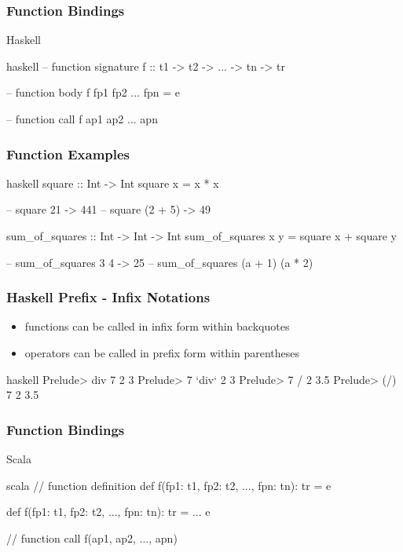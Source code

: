 \documentclass[dvipsnames]{beamer}
\theoremstyle{plain}
\begin{document}
\begin{frame}[fragile]
  \frametitle{Function Bindings}

  \begin{block}{Haskell}
    \begin{pygments}{haskell}
-- function signature
f :: t1 -> t2 -> ... -> tn -> tr

-- function body
f fp1 fp2 ... fpn = e

-- function call
f ap1 ap2 ... apn
    \end{pygments}
  \end{block}
\end{frame}

\begin{frame}[fragile]
  \frametitle{Function Examples}

  \begin{example}[Haskell]
    \begin{pygments}{haskell}
square :: Int -> Int
square x = x * x

-- square 21 -> 441
-- square (2 + 5) -> 49

sum_of_squares :: Int -> Int -> Int
sum_of_squares x y = square x + square y

-- sum_of_squares 3 4 -> 25
-- sum_of_squares (a + 1) (a * 2)
    \end{pygments}
  \end{example}
\end{frame}

\begin{frame}[fragile]
  \frametitle{Haskell Prefix - Infix Notations}

  \begin{itemize}
    \item functions can be called in infix form within backquotes
    \item operators can be called in prefix form within parentheses
  \end{itemize}

  \begin{example}
    \begin{pygments}{haskell}
Prelude> div 7 2
3
Prelude> 7 `div` 2
3
Prelude> 7 / 2
3.5
Prelude> (/) 7 2
3.5
    \end{pygments}
  \end{example}
\end{frame}

\begin{frame}[fragile]
  \frametitle{Function Bindings}

  \begin{block}{Scala}
    \begin{pygments}{scala}
// function definition
def f(fp1: t1, fp2: t2, ..., fpn: tn): tr = e

def f(fp1: t1, fp2: t2, ..., fpn: tn): tr = {
    ...
    e
}

// function call
f(ap1, ap2, ..., apn)
    \end{pygments}
  \end{block}
\end{frame}
\end{document}
